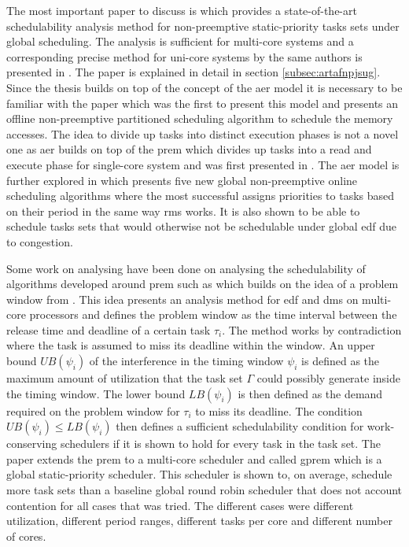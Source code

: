 \documentclass{kththesis}
\begin{document}
The most important paper to discuss is \parencite{nasri_response-time_2018} which provides a
state-of-the-art schedulability analysis method for non-preemptive static-priority tasks sets under global
scheduling. The analysis is sufficient for multi-core systems and a corresponding precise method for
uni-core systems by the same authors is presented in \parencite{nasri_exact_2017}. The paper is
explained in detail in section \ref{subsec:artafnpjsug}. Since the thesis builds on top of the
concept of the \acrshort{aer} model it is necessary to be familiar with the paper
\parencite{durrieu_predictable_2014} which was the first to present this model and presents an
offline non-preemptive partitioned scheduling algorithm to schedule the memory accesses. The idea to divide
up tasks into distinct execution phases is not a novel one as \acrshort{aer} builds on top of the
\acrshort{prem} which divides up tasks into a read and execute phase for single-core system and was
first presented in \parencite{pellizzoni_predictable_2011}. The \acrshort{aer} model is
further explored in \parencite{maia_closer_2016} which presents five new global non-preemptive
online scheduling algorithms where the most successful assigns priorities to tasks based on their
period in the same way \acrshort{rms} works. It is also shown to be able to schedule tasks sets that
would otherwise not be schedulable under global \acrshort{edf} due to congestion.

Some work on analysing have been done on analysing the schedulability of algorithms developed around
\acrshort{prem} such as \parencite{alhammad_schedulability_2014} which builds on the idea of a
problem window from \parencite{baker_multiprocessor_2003}. This idea presents an analysis method for
\acrshort{edf} and \acrshort{dms} on multi-core processors and defines the problem window as the
time interval between the release time and deadline of a certain task $ \tau_i $. The method works
by contradiction where the task is assumed to miss its deadline within the window. An upper bound $
UB(\psi_i) $ of the interference in the timing window $ \psi_i $ is defined as the maximum amount of
utilization that the task set $ \Gamma $ could possibly generate inside the timing window. The lower
bound $ LB(\psi_i) $ is then defined as the demand required on the problem window for $ \tau_i $ to
miss its deadline. The condition $ UB(\psi_i) \le LB(\psi_i) $ then defines a sufficient
schedulability condition for work-conserving schedulers if it is shown to hold for every task in the
task set. The paper extends the \acrshort{prem} to a multi-core scheduler and called
\acrshort{gprem} which is a global static-priority scheduler. This scheduler is shown to, on
average, schedule more task sets than a baseline global round robin scheduler that does not account
contention for all cases that was tried. The different cases were different utilization, different
period ranges, different tasks per core and different number of cores.
\end{document}
